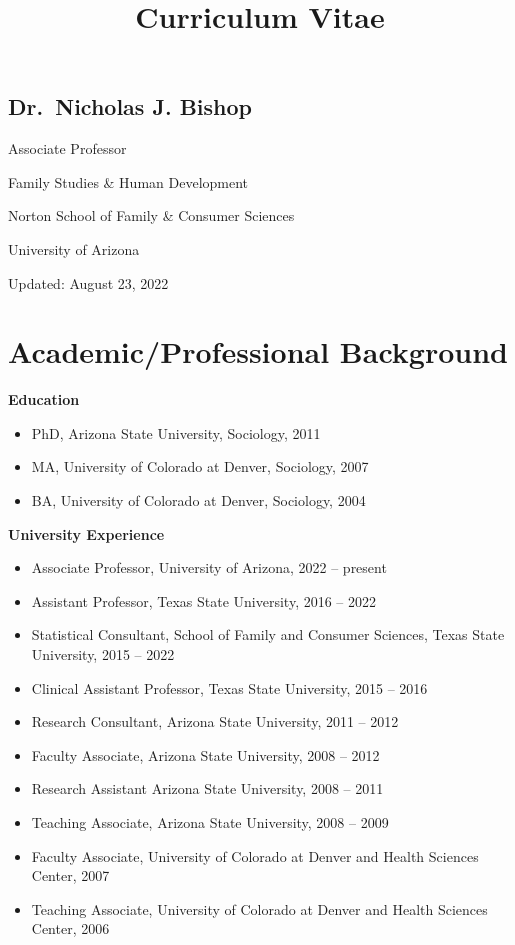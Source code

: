 \documentclass[
]{article}
\title{Curriculum Vitae}
\author{}
\date{\vspace{-2.5em}}
\begin{document}
\maketitle

\hypertarget{dr.-nicholas-j.-bishop}{%
\subsection{\texorpdfstring{\textbf{Dr.~Nicholas J.
Bishop}}{Dr.~Nicholas J. Bishop}}\label{dr.-nicholas-j.-bishop}}

Associate Professor

Family Studies \& Human Development

Norton School of Family \& Consumer Sciences

University of Arizona

Updated: August 23, 2022

\hypertarget{academicprofessional-background}{%
\section{\texorpdfstring{\textbf{Academic/Professional
Background}}{Academic/Professional Background}}\label{academicprofessional-background}}

\textbf{Education}

\begin{itemize}
\item
  PhD, Arizona State University, Sociology, 2011
\item
  MA, University of Colorado at Denver, Sociology, 2007
\item
  BA, University of Colorado at Denver, Sociology, 2004
\end{itemize}

\textbf{University Experience}

\begin{itemize}
\item
  Associate Professor, University of Arizona, 2022 -- present
\item
  Assistant Professor, Texas State University, 2016 -- 2022
\item
  Statistical Consultant, School of Family and Consumer Sciences, Texas
  State University, 2015 -- 2022
\item
  Clinical Assistant Professor, Texas State University, 2015 -- 2016
\item
  Research Consultant, Arizona State University, 2011 -- 2012
\item
  Faculty Associate, Arizona State University, 2008 -- 2012
\item
  Research Assistant Arizona State University, 2008 -- 2011
\item
  Teaching Associate, Arizona State University, 2008 -- 2009
\item
  Faculty Associate, University of Colorado at Denver and Health
  Sciences Center, 2007
\item
  Teaching Associate, University of Colorado at Denver and Health
  Sciences Center, 2006
\end{itemize}
\end{document}
